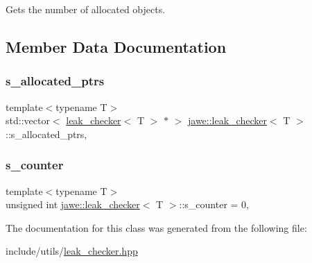 Gets the number of allocated objects. 

\subsection{Member Data Documentation}
\mbox{\label{classjawe_1_1leak__checker_a4c00676a347d0419491927c0f886b101}} 
\subsubsection{\texorpdfstring{s\+\_\+allocated\+\_\+ptrs}{s\_allocated\_ptrs}}
{\footnotesize\ttfamily template$<$typename T$>$ \\
std\+::vector$<$ \hyperlink{classjawe_1_1leak__checker}{leak\+\_\+checker}$<$ T $>$ $\ast$ $>$ \hyperlink{classjawe_1_1leak__checker}{jawe\+::leak\+\_\+checker}$<$ T $>$\+::s\+\_\+allocated\+\_\+ptrs\hspace{0.3cm}{\ttfamily [static]}, {\ttfamily [private]}}

\mbox{\label{classjawe_1_1leak__checker_a19a664431190acd44f4556015d51dce0}} 
\subsubsection{\texorpdfstring{s\+\_\+counter}{s\_counter}}
{\footnotesize\ttfamily template$<$typename T$>$ \\
unsigned int \hyperlink{classjawe_1_1leak__checker}{jawe\+::leak\+\_\+checker}$<$ T $>$\+::s\+\_\+counter = 0\hspace{0.3cm}{\ttfamily [static]}, {\ttfamily [private]}}



The documentation for this class was generated from the following file\+:\begin{DoxyCompactItemize}
\item 
include/utils/\hyperlink{leak__checker_8hpp}{leak\+\_\+checker.\+hpp}\end{DoxyCompactItemize}
